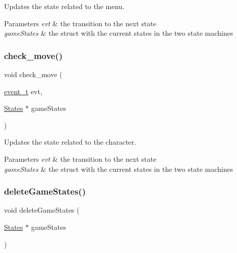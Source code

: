 Updates the state related to the menu. 


\begin{DoxyParams}{Parameters}
{\em evt} & the transition to the next state \\
\hline
{\em game\+States} & the struct with the current states in the two state machines \\
\hline
\end{DoxyParams}
\mbox{\label{group___state_machine_ga993a672fc77bafce6ec7ef9db4008071}} 
\subsubsection{\texorpdfstring{check\+\_\+move()}{check\_move()}}
{\footnotesize\ttfamily void check\+\_\+move (\begin{DoxyParamCaption}\item[{\hyperlink{group___state_machine_ga2fb9b58e4e5f14f40af8b4a1425841f8}{event\+\_\+t}}]{evt,  }\item[{\hyperlink{struct_states}{States} $\ast$}]{game\+States }\end{DoxyParamCaption})}



Updates the state related to the character. 


\begin{DoxyParams}{Parameters}
{\em evt} & the transition to the next state \\
\hline
{\em game\+States} & the struct with the current states in the two state machines \\
\hline
\end{DoxyParams}
\mbox{\label{group___state_machine_gad70668a1c3bdf581906790c7e7da0409}} 
\subsubsection{\texorpdfstring{delete\+Game\+States()}{deleteGameStates()}}
{\footnotesize\ttfamily void delete\+Game\+States (\begin{DoxyParamCaption}\item[{\hyperlink{struct_states}{States} $\ast$}]{game\+States }\end{DoxyParamCaption})}



